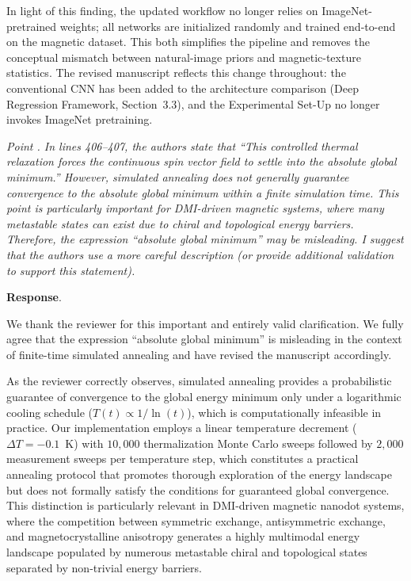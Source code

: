 \documentclass[review,12pt]{report}
\newenvironment{reviewer}{\setcounter{pointcounter}{1}}{}
\newcommand{\point}[1]{\medskip \noindent
 \textsl{{\fontseries{b}\selectfont Point \thepointcounter}.
 \stepcounter{pointcounter} #1}}
\newcommand{\reply}{\medskip \noindent \textbf{Response}.\ }
\begin{document}
\begin{reviewer}
{In light of this finding, the updated workflow no longer relies on ImageNet-pretrained weights; all networks are initialized randomly and trained end-to-end on the magnetic dataset. This both simplifies the pipeline and removes the conceptual mismatch between natural-image priors and magnetic-texture statistics. The revised manuscript reflects this change throughout: the conventional CNN has been added to the architecture comparison (Deep Regression Framework, Section~3.3), and the Experimental Set-Up no longer invokes ImageNet pretraining.}

 

\point{In lines 406–407, the authors state that “This controlled thermal relaxation forces the continuous spin vector field to settle into the absolute global minimum.” However, simulated annealing does not generally guarantee convergence to the absolute global minimum within a finite simulation time. This point is particularly important for DMI-driven magnetic systems, where many metastable states can exist due to chiral and topological energy barriers. Therefore, the expression “absolute global minimum” may be misleading. I suggest that the authors use a more careful description (or provide additional validation to support this statement).} 

\reply{We thank the reviewer for this important and entirely valid clarification. We fully agree that the expression ``absolute global minimum'' is misleading in the context of finite-time simulated annealing and have revised the manuscript accordingly.

As the reviewer correctly observes, simulated annealing provides a probabilistic guarantee of convergence to the global energy minimum only under a logarithmic cooling schedule ($T(t) \propto 1/\ln(t)$), which is computationally infeasible in practice. Our implementation employs a linear temperature decrement ($\Delta T = -0.1$~K) with $10{,}000$ thermalization Monte Carlo sweeps followed by $2{,}000$ measurement sweeps per temperature step, which constitutes a practical annealing protocol that promotes thorough exploration of the energy landscape but does not formally satisfy the conditions for guaranteed global convergence. This distinction is particularly relevant in DMI-driven magnetic nanodot systems, where the competition between symmetric exchange, antisymmetric exchange, and magnetocrystalline anisotropy generates a highly multimodal energy landscape populated by numerous metastable chiral and topological states separated by non-trivial energy barriers.

}
\end{reviewer}
\end{document}
